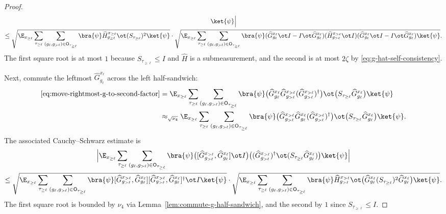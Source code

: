 \begin{proof}
\begin{multline}
		\ket{\psi}
		\Bigr|\\
		\le
		\sqrt{
		\E_{x_{\ge \ell}} \sum_{\tau_{\ge \ell}} \sum_{(g_\ell,g_{>\ell})\in \mathsf O_{\tau_{\ge \ell}}}
		\bra{\psi} \widehat H_{g_{\ge \ell}}^{x_{\ge \ell}} \ot (S_{\tau_{\ge \ell}})^2 \ket{\psi}
		}
		\cdot
		\sqrt{
		\E_{x_{\ge \ell}} \sum_{\tau_{\ge \ell}} \sum_{(g_\ell,g_{>\ell})\in \mathsf O_{\tau_{\ge \ell}}}
		\bra{\psi}
		(\widehat G_{g_\ell}^{x_\ell}\ot I - I \ot \widehat G_{g_\ell}^{x_\ell})
		(\widehat H_{g_{>\ell}}^{x_{>\ell}} \ot I)
		(\widehat G_{g_\ell}^{x_\ell}\ot I - I \ot \widehat G_{g_\ell}^{x_\ell})
		\ket{\psi}
		}.
	\end{multline}
	The first square root is at most $1$ because $S_{\tau_{\ge \ell}}\le I$ and $\widehat H$ is a submeasurement, and the second is at most $2\zeta$ by \ref{eq:g-hat-self-consistency}.

	Next, commute the leftmost $\widehat G_{g_\ell}^{x_\ell}$ across the left half-sandwich:
	\begin{align}
		\eqref{eq:move-rightmost-g-to-second-factor}
		 & =
		\E_{x_{\ge \ell}} \sum_{\tau_{\ge \ell}} \sum_{(g_\ell,g_{>\ell})\in \mathsf O_{\tau_{\ge \ell}}}
		\bra{\psi}
		\bigl(\widehat G_{g_\ell}^{x_\ell}\widehat G_{g_{>\ell}}^{x_{>\ell}}(\widehat G_{g_{>\ell}}^{x_{>\ell}})^\dagger\bigr)
		\ot \bigl(S_{\tau_{\ge \ell}}\widehat G_{g_\ell}^{x_\ell}\bigr)\ket{\psi}\nonumber \\
		 & \approx_{\sqrt{\nu_4}}
		\E_{x_{\ge \ell}} \sum_{\tau_{\ge \ell}} \sum_{(g_\ell,g_{>\ell})\in \mathsf O_{\tau_{\ge \ell}}}
		\bra{\psi}
		\bigl(\widehat G_{g_{>\ell}}^{x_{>\ell}}\widehat G_{g_\ell}^{x_\ell}(\widehat G_{g_{>\ell}}^{x_{>\ell}})^\dagger\bigr)
		\ot \bigl(S_{\tau_{\ge \ell}}\widehat G_{g_\ell}^{x_\ell}\bigr)\ket{\psi}.
		\label{eq:commute-g-part-one}
	\end{align}
	The associated Cauchy--Schwarz estimate is
	\begin{multline}\label{eq:adjoint-commutator-cauchy-schwarz}
		\Bigl|
		\E_{x_{\ge \ell}} \sum_{\tau_{\ge \ell}} \sum_{(g_\ell,g_{>\ell})\in \mathsf O_{\tau_{\ge \ell}}}
		\bra{\psi}
		\bigl([\widehat G_{g_{>\ell}}^{x_{>\ell}},\widehat G_{g_\ell}^{x_\ell}] \ot I\bigr)
		\bigl((\widehat G_{g_{>\ell}}^{x_{>\ell}})^\dagger \ot (S_{\tau_{\ge \ell}}\widehat G_{g_\ell}^{x_\ell})\bigr)
		\ket{\psi}
		\Bigr|\\
		\le
		\sqrt{
		\E_{x_{\ge \ell}} \sum_{\tau_{\ge \ell}} \sum_{(g_\ell,g_{>\ell})\in \mathsf O_{\tau_{\ge \ell}}}
		\bra{\psi}
		[\widehat G_{g_{>\ell}}^{x_{>\ell}},\widehat G_{g_\ell}^{x_\ell}]
		[\widehat G_{g_{>\ell}}^{x_{>\ell}},\widehat G_{g_\ell}^{x_\ell}]^\dagger
		\ot I
		\ket{\psi}
		}
		\cdot
		\sqrt{
		\E_{x_{\ge \ell}} \sum_{\tau_{\ge \ell}} \sum_{(g_\ell,g_{>\ell})\in \mathsf O_{\tau_{\ge \ell}}}
		\bra{\psi}
		\widehat H_{g_{>\ell}}^{x_{>\ell}}
		\ot \bigl(\widehat G_{g_\ell}^{x_\ell}(S_{\tau_{\ge \ell}})^2\widehat G_{g_\ell}^{x_\ell}\bigr)
		\ket{\psi}
		}.
	\end{multline}
	The first square root is bounded by $\nu_4$ via Lemma~\ref{lem:commute-g-half-sandwich}, and the second by $1$ since $S_{\tau_{\ge \ell}}\le I$.


\end{proof}
